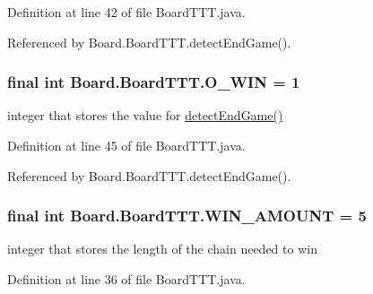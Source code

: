 Definition at line 42 of file Board\+T\+T\+T.\+java.



Referenced by Board.\+Board\+T\+T\+T.\+detect\+End\+Game().

\hypertarget{class_board_1_1_board_t_t_t_a989aacd76a6193fe54a4500dd8151b41}{}
\subsubsection[{O\+\_\+\+W\+I\+N}]{\setlength{\rightskip}{0pt plus 5cm}final int Board.\+Board\+T\+T\+T.\+O\+\_\+\+W\+I\+N = 1\hspace{0.3cm}{\ttfamily [static]}}\label{class_board_1_1_board_t_t_t_a989aacd76a6193fe54a4500dd8151b41}
integer that stores the value for \hyperlink{class_board_1_1_board_t_t_t_a08f36da4210111d8f129be28a550334e}{detect\+End\+Game()} 

Definition at line 45 of file Board\+T\+T\+T.\+java.



Referenced by Board.\+Board\+T\+T\+T.\+detect\+End\+Game().

\hypertarget{class_board_1_1_board_t_t_t_ab11d997e2ea0983b566f23c4685767f6}{}
\subsubsection[{W\+I\+N\+\_\+\+A\+M\+O\+U\+N\+T}]{\setlength{\rightskip}{0pt plus 5cm}final int Board.\+Board\+T\+T\+T.\+W\+I\+N\+\_\+\+A\+M\+O\+U\+N\+T = 5\hspace{0.3cm}{\ttfamily [private]}}\label{class_board_1_1_board_t_t_t_ab11d997e2ea0983b566f23c4685767f6}
integer that stores the length of the chain needed to win 

Definition at line 36 of file Board\+T\+T\+T.\+java.

\hypertarget{class_board_1_1_board_t_t_t_ab77ee706643fb1825e78f6b8dcacc021}{}
